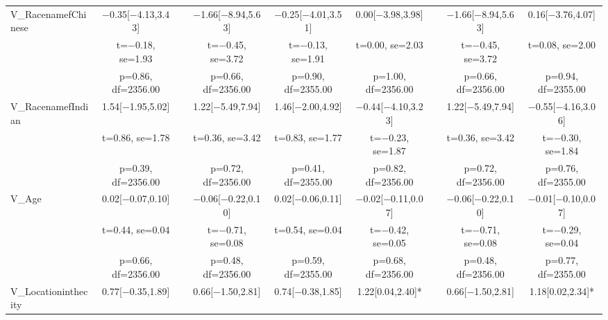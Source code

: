 \documentclass[]{report}
\begin{document}
\begin{table}
{\begin{tabular}[t]{lcccccccc}
		V\_RacenamefChinese & \num{-0.35}[\num{-4.13},\num{3.43}] &  & \num{-1.66}[\num{-8.94},\num{5.63}] & \num{-0.25}[\num{-4.01},\num{3.51}] & \num{0.00}[\num{-3.98},\num{3.98}] &  & \num{-1.66}[\num{-8.94},\num{5.63}] & \num{0.16}[\num{-3.76},\num{4.07}]\\
		& t=\num{-0.18}, se=\num{1.93} &  & t=\num{-0.45}, se=\num{3.72} & t=\num{-0.13}, se=\num{1.91} & t=\num{0.00}, se=\num{2.03} &  & t=\num{-0.45}, se=\num{3.72} & t=\num{0.08}, se=\num{2.00}\\
		& p=\num{0.86}, df=\num{2356.00} &  & p=\num{0.66}, df=\num{2356.00} & p=\num{0.90}, df=\num{2355.00} & p=\num{1.00}, df=\num{2356.00} &  & p=\num{0.66}, df=\num{2356.00} & p=\num{0.94}, df=\num{2355.00}\\
		V\_RacenamefIndian & \num{1.54}[\num{-1.95},\num{5.02}] &  & \num{1.22}[\num{-5.49},\num{7.94}] & \num{1.46}[\num{-2.00},\num{4.92}] & \num{-0.44}[\num{-4.10},\num{3.23}] &  & \num{1.22}[\num{-5.49},\num{7.94}] & \num{-0.55}[\num{-4.16},\num{3.06}]\\
		& t=\num{0.86}, se=\num{1.78} &  & t=\num{0.36}, se=\num{3.42} & t=\num{0.83}, se=\num{1.77} & t=\num{-0.23}, se=\num{1.87} &  & t=\num{0.36}, se=\num{3.42} & t=\num{-0.30}, se=\num{1.84}\\
		& p=\num{0.39}, df=\num{2356.00} &  & p=\num{0.72}, df=\num{2356.00} & p=\num{0.41}, df=\num{2355.00} & p=\num{0.82}, df=\num{2356.00} &  & p=\num{0.72}, df=\num{2356.00} & p=\num{0.76}, df=\num{2355.00}\\
		V\_Age & \num{0.02}[\num{-0.07},\num{0.10}] &  & \num{-0.06}[\num{-0.22},\num{0.10}] & \num{0.02}[\num{-0.06},\num{0.11}] & \num{-0.02}[\num{-0.11},\num{0.07}] &  & \num{-0.06}[\num{-0.22},\num{0.10}] & \num{-0.01}[\num{-0.10},\num{0.07}]\\
		& t=\num{0.44}, se=\num{0.04} &  & t=\num{-0.71}, se=\num{0.08} & t=\num{0.54}, se=\num{0.04} & t=\num{-0.42}, se=\num{0.05} &  & t=\num{-0.71}, se=\num{0.08} & t=\num{-0.29}, se=\num{0.04}\\
		& p=\num{0.66}, df=\num{2356.00} &  & p=\num{0.48}, df=\num{2356.00} & p=\num{0.59}, df=\num{2355.00} & p=\num{0.68}, df=\num{2356.00} &  & p=\num{0.48}, df=\num{2356.00} & p=\num{0.77}, df=\num{2355.00}\\
		V\_Locationinthecity & \num{0.77}[\num{-0.35},\num{1.89}] &  & \num{0.66}[\num{-1.50},\num{2.81}] & \num{0.74}[\num{-0.38},\num{1.85}] & \num{1.22}[\num{0.04},\num{2.40}]* &  & \num{0.66}[\num{-1.50},\num{2.81}] & \num{1.18}[\num{0.02},\num{2.34}]*\\

\end{tabular}}
\end{table}
\end{document}
